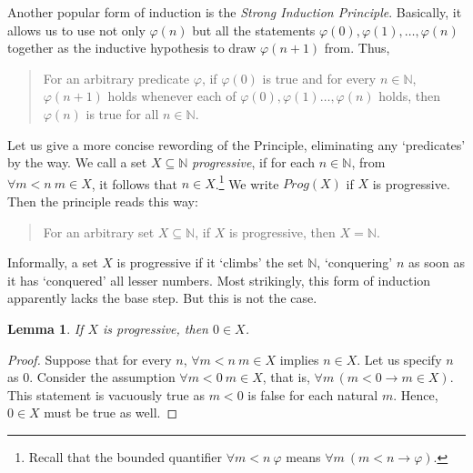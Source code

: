 \documentclass[12pt,notitlepage]{article}
\theoremstyle{plain}
\newtheorem{lemma}[thm]{Lemma}
\theoremstyle{definition}
\theoremstyle{plain}
\newcommand{\N}{\mathbb{N}}
\newcommand{\sbs}{\subseteq}
\renewcommand{\phi}{\varphi}
\newcommand{\1}{\mathbf{1}}
\newcommand{\0}{\mathbf{0}}
\newcommand{\mcomm}[1]{}
\begin{document}
Another popular form of induction is the \emph{Strong Induction Principle}. Basically, it allows us to use not only $\phi(n)$ but all the statements $\phi(0), \phi(1),\ldots, \phi(n)$ together as the inductive hypothesis to draw $\phi(n+1)$ from. Thus,
\begin{quote}
For an arbitrary predicate $\phi$, if $\phi(0)$ is true and for every $n \in \N$, $\phi(n+1)$ holds whenever each of $\phi(0), \phi(1) \ldots, \phi(n)$ holds, then $\phi(n)$ is true for all $n \in \N$.
\end{quote}
Let us give a more concise rewording of the Principle, eliminating any `predicates' by the way. We call a set $X \sbs \N$ \emph{progressive}, if for each $n \in \N$, from  $\forall m < n\  m \in X$, it follows that $n \in X$.\footnote{Recall that the bounded quantifier $\forall m < n\ \phi$ means $\forall m\ (m < n \to \phi)$.} We write $Prog(X)$ if $X$ is progressive. Then the principle reads this way:
\begin{quote}
For an arbitrary set $X \sbs \N$, if $X$ is progressive, then $X = \N$.
\end{quote}
\mcomm{Of course, the Instructor might prefer to call a \emph{predicate} progressive.}

Informally, a set $X$ is progressive if it `climbs' the set $\N$, `conquering' $n$ as soon as it has `conquered' all lesser numbers. Most strikingly, this form of induction apparently lacks the base step. But this is not the case.

\mcomm{In practice, the students usually wonder where the base case has gone to.}
\begin{lemma}
If $X$ is progressive, then $0 \in X$.
\end{lemma}
\begin{proof}
Suppose that for every $n$, $\forall m < n\ m \in X$ implies $n \in X$. Let us specify $n$ as $0$. Consider the assumption $\forall m < 0\  m \in X$, that is, $\forall m\, (m < 0 \to m \in X)$. This statement is vacuously true as $m < 0$ is false for each natural $m$. Hence, $0 \in X$ must be true as well.
\end{proof}
\end{document}

